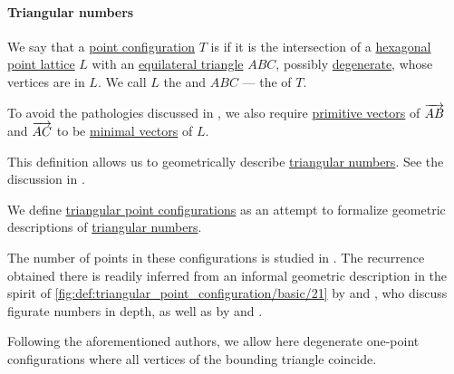 \paragraph{Triangular numbers}

\begin{definition}\label{def:triangular_point_configuration}\mimprovised
  We say that a \hyperref[def:point_configuration]{point configuration} \( T \) is  if it is the intersection of a \hyperref[def:hexagonal_point_lattice]{hexagonal point lattice} \( L \) with an \hyperref[def:triangle/equilateral]{equilateral triangle} \( ABC \), possibly \hyperref[def:degenerate_polytope]{degenerate}, whose vertices are in \( L \). We call \( L \) the  and \( ABC \) --- the  of \( T \).

  To avoid the pathologies discussed in , we also require \hyperref[def:primitive_lattice_vector]{primitive vectors} of \( \overrightarrow{AB} \) and \( \overrightarrow{AC} \) to be \hyperref[def:minimal_lattice_vector]{minimal vectors} of \( L \).
\end{definition}
\begin{comments}
  \item This definition allows us to geometrically describe \hyperref[def:triangular_number]{triangular numbers}. See the discussion in .
\end{comments}

\begin{remark}\label{rem:triangular_point_configurations}
  We define \hyperref[def:triangular_point_configuration]{triangular point configurations} as an attempt to formalize geometric descriptions of \hyperref[def:triangular_number]{triangular numbers}.

  The number of points in these configurations is studied in . The recurrence obtained there is readily inferred from an informal geometric description in the spirit of \cref{fig:def:triangular_point_configuration/basic/21} by  and , who discuss figurate numbers in depth, as well as by  and .

  Following the aforementioned authors, we allow here degenerate one-point configurations where all vertices of the bounding triangle coincide.
\end{remark}

